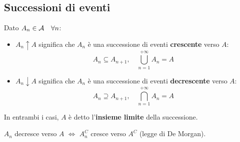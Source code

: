 \subsection{Successioni di eventi}

\begin{defn}
  Dato $A_n \in \mathcal A \quad \forall n$:
  \begin{itemize}
    \item $A_n \uparrow A$ significa che $A_n$ è una successione di eventi \textbf{crescente} verso $A$:
      $$A_n \subseteq A_{n+1}, \quad \bigcup\limits_{n=1}^{+\infty} A_n  = A$$
    \item $A_n \downarrow A$ significa che $A_n$ è una successione di eventi \textbf{decrescente} verso $A$:
      $$A_n \supseteq A_{n+1}, \quad \bigcap\limits_{n=1}^{+\infty} A_n  = A$$
  \end{itemize}
In entrambi i casi, $A$ è detto l'\textbf{insieme limite} della successione.
\end{defn}
\begin{nb}
  $A_n$ decresce verso $A$ $\iff$ $A_n^C$ cresce verso $A^C$ (legge di De Morgan).
\end{nb}
